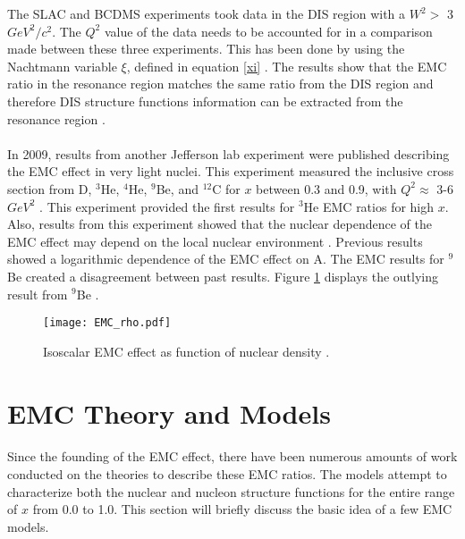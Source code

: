 The SLAC and BCDMS experiments took data in the DIS region with a $W^2 > $ 3 $GeV^2/c^2$. The $Q^2$ value of the data needs to be accounted for in a comparison made between these three experiments. This has been done by using the Nachtmann variable $\xi$, defined in equation \ref{xi} \cite{EMC_JA}. The results show that the EMC ratio in the resonance region matches the same ratio from the DIS region and therefore DIS structure functions information can be extracted from the resonance region \cite{seelyth}. 
\paragraph{}In 2009, results from another Jefferson lab experiment were published describing the EMC effect in very light nuclei. This experiment measured the inclusive cross section from D, $^3$He, $^4$He, $^9$Be, and $^{12}$C for $x$ between 0.3 and 0.9, with $Q^2 \approx$ 3-6 $GeV^2$ \cite{seeley}.  This experiment provided the first results for $^3$He EMC ratios for high $x$.  Also, results from this experiment showed that the nuclear dependence of the EMC effect may depend on the local nuclear environment \cite{seeley}. Previous results showed a logarithmic dependence of the EMC effect on A. The EMC results for $^9$Be created a disagreement between past results. Figure \ref{EMCrho}  displays the outlying result from $^9$Be \cite{seeley}.

\iffalse
\begin{figure}[h]
	\centering
	\texttt{[image: He3\_EMC\_seely.pdf]} 
	\caption{EMC ratio for He3, Blue points are corrected for proton excess\cite{seeley}.}
	\label{EMCHe3_Seely}
\end{figure} 
\fi

\begin{figure}[t]
	\centering
	\texttt{[image: EMC\_rho.pdf]} 
	\caption{Isoscalar EMC effect as function of nuclear density \cite{seeley}.}
	\label{EMCrho}
\end{figure} 

\section{EMC Theory and Models}
\paragraph{}Since the founding of the EMC effect, there have been numerous amounts of work conducted on the theories to describe these EMC ratios. The models attempt to characterize both the nuclear and nucleon structure functions for the entire range of $x$ from 0.0 to 1.0. This section will briefly discuss the basic idea of a few EMC models.
